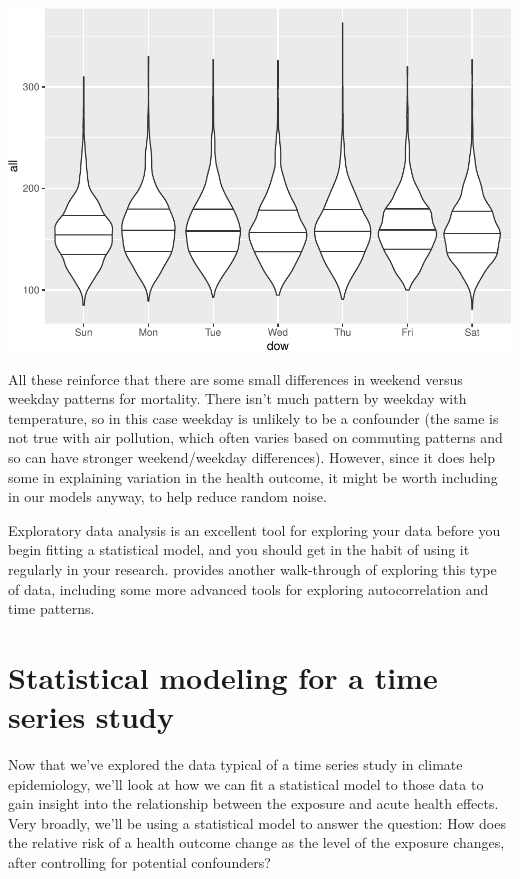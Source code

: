 \documentclass[
]{book}
\begin{document}
\includegraphics{adv_epi_analysis_files/figure-latex/unnamed-chunk-22-1.pdf}

All these reinforce that there are some small differences in weekend versus weekday
patterns for mortality. There isn't much pattern by weekday with temperature, so
in this case weekday is unlikely to be a confounder (the same is not true with
air pollution, which often varies based on commuting patterns and so can have
stronger weekend/weekday differences). However, since it does help some in explaining
variation in the health outcome, it might be worth including in our models anyway,
to help reduce random noise.

Exploratory data analysis is an excellent tool for exploring your data before
you begin fitting a statistical model, and you should get in the habit of using
it regularly in your research. \citet{dominici2008statistical5} provides another walk-through of exploring this type of data, including some more advanced tools
for exploring autocorrelation and time patterns.

\hypertarget{statistical-modeling-for-a-time-series-study}{%
\section{Statistical modeling for a time series study}\label{statistical-modeling-for-a-time-series-study}}

Now that we've explored the data typical of a time series study in climate
epidemiology, we'll look at how we can fit a statistical model to those
data to gain insight into the relationship between the exposure and
acute health effects. Very broadly, we'll be using a statistical model to answer
the question: How does the relative risk of a health outcome change as
the level of the exposure changes, after controlling for potential confounders?
\end{document}
